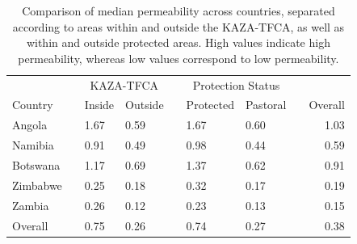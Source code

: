 \documentclass[abstract=on,10pt,a4paper,bibliography=totocnumbered]{scrartcl}
\begin{document}
\begin{table}[h]
  \caption{Comparison of median permeability across countries, separated
  according to areas within and outside the KAZA-TFCA, as well as within and
  outside protected areas. High values indicate high permeability, whereas low
  values correspond to low permeability.}
  \label{PermeabilityComp}
  \begin{center}
    \resizebox{0.65\textwidth}{!} {
      \begin{tabular}{llllllllr}
      & & \multicolumn{2}{c}{KAZA-TFCA} && \multicolumn{2}{c}{Protection Status} \\
      \cline{3-4} \cline{6-7}
      Country & & Inside & Outside & & Protected & Pastoral & & Overall \\
      \hline
      Angola & & 1.67 & 0.59 & & 1.67 & 0.60 & & 1.03 \\
      Namibia & & 0.91 & 0.49 & & 0.98 & 0.44 & & 0.59 \\
      Botswana & & 1.17 & 0.69 & & 1.37 & 0.62 & & 0.91 \\
      Zimbabwe & & 0.25 & 0.18 & & 0.32 & 0.17 & & 0.19 \\
      Zambia & & 0.26 & 0.12 & & 0.23 & 0.13 & & 0.15 \\
      \hline
      Overall & & 0.75 & 0.26 & & 0.74 & 0.27 & & 0.38 \\
      \end{tabular}
    }
  \end{center}
\end{table}
\end{document}
